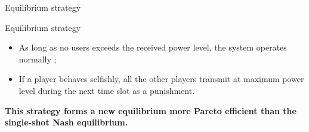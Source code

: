 
\begin{frame}{Equilibrium strategy}
    \begin{block}{Equilibrium strategy}
        \begin{itemize}
            \item As long as no users exceeds the received power level, the system operates normally ;
            \item If a player behaves selfishly, all the other players transmit at maximum power level
            during the next time slot as a punishment.
        \end{itemize}
    \end{block}

    \vspace{0.5cm}
    \textbf{{\color{green}This strategy forms a new equilibrium more Pareto efficient than the
    single-shot Nash equilibrium.}}
\end{frame}
